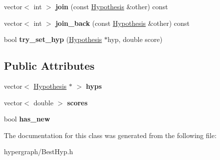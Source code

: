 \begin{DoxyCompactItemize}
\item 
\hypertarget{classScarab_1_1HG_1_1BestHyp_adb8421adc7af8cb8b4f5116599e807fd}{
vector$<$ int $>$ {\bfseries join} (const \hyperlink{structScarab_1_1HG_1_1Hypothesis}{Hypothesis} \&other) const }
\label{classScarab_1_1HG_1_1BestHyp_adb8421adc7af8cb8b4f5116599e807fd}

\item 
\hypertarget{classScarab_1_1HG_1_1BestHyp_ac9e2d1fc7e0d88865fa18d25877d63b8}{
vector$<$ int $>$ {\bfseries join\_\-back} (const \hyperlink{structScarab_1_1HG_1_1Hypothesis}{Hypothesis} \&other) const }
\label{classScarab_1_1HG_1_1BestHyp_ac9e2d1fc7e0d88865fa18d25877d63b8}

\item 
\hypertarget{classScarab_1_1HG_1_1BestHyp_ac079b15bdd5c65ede04d4e99eb683ff8}{
bool {\bfseries try\_\-set\_\-hyp} (\hyperlink{structScarab_1_1HG_1_1Hypothesis}{Hypothesis} $\ast$hyp, double score)}
\label{classScarab_1_1HG_1_1BestHyp_ac079b15bdd5c65ede04d4e99eb683ff8}

\end{DoxyCompactItemize}
\subsection*{Public Attributes}
\begin{DoxyCompactItemize}
\item 
\hypertarget{classScarab_1_1HG_1_1BestHyp_ab293f04d4d58e1503066c0d7b4e4013b}{
vector$<$ \hyperlink{structScarab_1_1HG_1_1Hypothesis}{Hypothesis} $\ast$ $>$ {\bfseries hyps}}
\label{classScarab_1_1HG_1_1BestHyp_ab293f04d4d58e1503066c0d7b4e4013b}

\item 
\hypertarget{classScarab_1_1HG_1_1BestHyp_a63d4d0feac5cff2ce7e00bdd15feb738}{
vector$<$ double $>$ {\bfseries scores}}
\label{classScarab_1_1HG_1_1BestHyp_a63d4d0feac5cff2ce7e00bdd15feb738}

\item 
\hypertarget{classScarab_1_1HG_1_1BestHyp_abf49848ebb40edc6cd7c30af8139f389}{
bool {\bfseries has\_\-new}}
\label{classScarab_1_1HG_1_1BestHyp_abf49848ebb40edc6cd7c30af8139f389}

\end{DoxyCompactItemize}


The documentation for this class was generated from the following file:\begin{DoxyCompactItemize}
\item 
hypergraph/BestHyp.h\end{DoxyCompactItemize}
